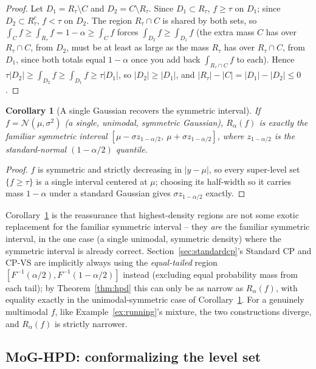 \documentclass[11pt]{article}
\newtheorem{corollary}{Corollary}[section]
\begin{document}
\begin{proof}
Let $D_1 = R_\tau \setminus C$ and $D_2 = C\setminus R_\tau$. Since $D_1 \subset R_\tau$, $f\ge
\tau$ on $D_1$; since $D_2 \subset R_\tau^c$, $f < \tau$ on $D_2$. The region $R_\tau \cap C$ is
shared by both sets, so $\int_C f \ge \int_{R_\tau} f = 1-\alpha \ge \int_C f$ forces
$\int_{D_2} f \ge \int_{D_1} f$ (the extra mass $C$ has over $R_\tau\cap C$, from $D_2$, must be at
least as large as the mass $R_\tau$ has over $R_\tau\cap C$, from $D_1$, since both totals equal
$1-\alpha$ once you add back $\int_{R_\tau\cap C} f$ to each). Hence
$\tau|D_2| \ge \int_{D_2}f \ge \int_{D_1}f \ge \tau|D_1|$, so $|D_2|\ge|D_1|$, and
$|R_\tau|-|C| = |D_1|-|D_2| \le 0$.
\end{proof}

\begin{corollary}[A single Gaussian recovers the symmetric interval]
\label{cor:gauss-hpd}
If $f=\mathcal N(\mu,\sigma^2)$ (a single, unimodal, symmetric Gaussian), $R_\alpha(f)$ is exactly
the familiar symmetric interval $[\mu - \sigma z_{1-\alpha/2},\ \mu+\sigma z_{1-\alpha/2}]$, where
$z_{1-\alpha/2}$ is the standard-normal $(1-\alpha/2)$ quantile.
\end{corollary}
\begin{proof}
$f$ is symmetric and strictly decreasing in $|y-\mu|$, so every super-level set $\{f\ge\tau\}$ is a
single interval centered at $\mu$; choosing its half-width so it carries mass $1-\alpha$ under a
standard Gaussian gives $\sigma z_{1-\alpha/2}$ exactly.
\end{proof}

Corollary~\ref{cor:gauss-hpd} is the reassurance that highest-density regions are not some exotic
replacement for the familiar symmetric interval -- they \emph{are} the familiar symmetric interval,
in the one case (a single unimodal, symmetric density) where the symmetric interval is already
correct. Section~\ref{sec:standardcp}'s Standard CP and CP-VS are implicitly always using the
\emph{equal-tailed} region $[F^{-1}(\alpha/2), F^{-1}(1-\alpha/2)]$ instead (excluding equal
probability mass from each tail); by Theorem~\ref{thm:hpd} this can only be as narrow as
$R_\alpha(f)$, with equality exactly in the unimodal-symmetric case of
Corollary~\ref{cor:gauss-hpd}. For a genuinely multimodal $f$, like Example~\ref{ex:running}'s
mixture, the two constructions diverge, and $R_\alpha(f)$ is strictly narrower.

\subsection{MoG-HPD: conformalizing the level set}
\label{sec:moghpd}
\end{document}
